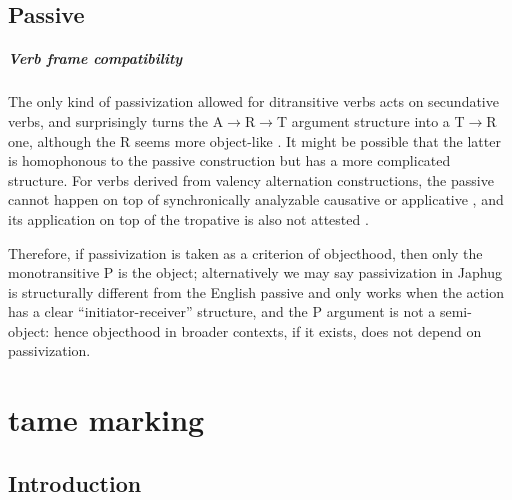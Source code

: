 \documentclass[a4paper, oneside, 12pt]{report}
\newcommand*{\textto}{$\to$}
\newcommand*{\citesec}[1]{\S~{#1}}
\newcommand*{\citepage}[1]{p.~{#1}}
\begin{document}
\section{Passive}

\paragraph*{Verb frame compatibility}\label{sec:voice.passive.input}
The only kind of passivization allowed for ditransitive verbs
acts on secundative verbs,
and surprisingly turns the A\textto R\textto T argument structure
into a T\textto R one, although the R seems more object-like
\citep[\citepage{884}]{jacques2021grammar}.
It might be possible that the latter is homophonous to the passive construction
but has a more complicated structure.
For verbs derived from valency alternation constructions,
the passive cannot happen on top of synchronically analyzable causative or applicative 
\citep[\citepage{885}]{jacques2021grammar},
and its application on top of the tropative is also not attested
\citep[\citesec{17.5.4}]{jacques2021grammar}.

Therefore, if passivization is taken as a criterion of objecthood,
then only the monotransitive P is the object;
alternatively we may say passivization in Japhug
is structurally different from the English passive
and only works when the action has a clear ``initiator-receiver'' structure,
and the P argument is not a semi-object:
hence objecthood in broader contexts, if it exists,
does not depend on passivization.

\chapter{\acs{tame} marking}

\section{Introduction}
\end{document}

